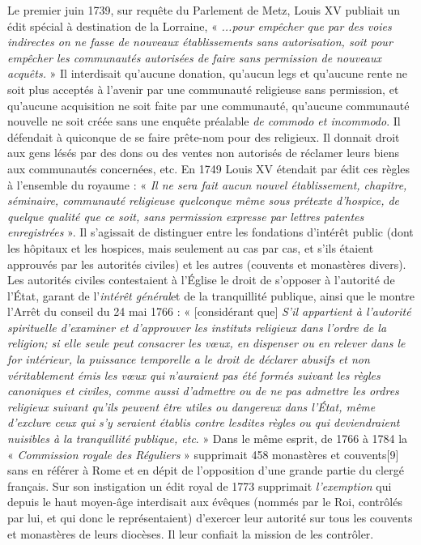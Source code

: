  Le premier juin 1739, sur requête du Parlement de Metz, Louis XV publiait un édit spécial à destination de la Lorraine, « \emph{...pour empêcher que par des voies indirectes on ne fasse de nouveaux établissements sans autorisation, soit pour empêcher les communautés autorisées de faire sans permission de nouveaux acquêts.} » Il interdisait qu'aucune donation, qu'aucun legs et qu'aucune rente ne soit plus acceptés à l'avenir par une communauté religieuse sans permission, et qu'aucune acquisition ne soit faite par une communauté, qu'aucune communauté nouvelle ne soit créée sans une enquête préalable\emph{ de commodo et incommodo}. Il défendait à quiconque de se faire prête-nom pour des religieux. Il donnait droit aux gens lésés par des dons ou des ventes non autorisés de réclamer leurs biens aux communautés concernées, etc. En 1749 Louis XV étendait par édit ces règles à l'ensemble du royaume : « \emph{ Il ne sera fait aucun nouvel établissement, chapitre, séminaire, communauté religieuse quelconque même sous prétexte d'hospice, de quelque qualité que ce soit, sans permission expresse par lettres patentes enregistrées} ». Il s'agissait de distinguer entre les fondations d'intérêt public (dont les hôpitaux et les hospices, mais seulement au cas par cas, et s'ils étaient approuvés par les autorités civiles) et les autres (couvents et monastères divers). 
 Les autorités civiles contestaient à l'Église le droit de s'opposer à l'autorité de l'État, garant de l'\emph{intérêt général}et de la tranquillité publique, ainsi que le montre l'Arrêt du conseil du 24 mai 1766 : « [considérant que] \emph{S'il appartient à l'autorité spirituelle d'examiner et d'approuver les instituts religieux dans l'ordre de la religion; si elle seule peut consacrer les vœux, en dispenser ou en relever dans le for intérieur, la puissance temporelle a le droit de déclarer abusifs et non véritablement émis les vœux qui n'auraient pas été formés suivant les règles canoniques et civiles, comme aussi d'admettre ou de ne pas admettre les ordres religieux suivant qu'ils peuvent être utiles ou dangereux dans l'État, même d'exclure ceux qui s'y seraient établis contre lesdites règles ou qui deviendraient nuisibles à la tranquillité publique, etc}. » 
 Dans le même esprit, de 1766 à 1784 la « \emph{Commission royale des Réguliers} » supprimait 458 monastères et couvents[9] sans en référer à Rome et en dépit de l'opposition d'une grande partie du clergé français. Sur son instigation un édit royal de 1773 supprimait\emph{ l'exemption} qui depuis le haut moyen-âge interdisait aux évêques (nommés par le Roi, contrôlés par lui, et qui donc le représentaient) d'exercer leur autorité sur tous les couvents et monastères de leurs diocèses. Il leur confiait la mission de les contrôler. 
